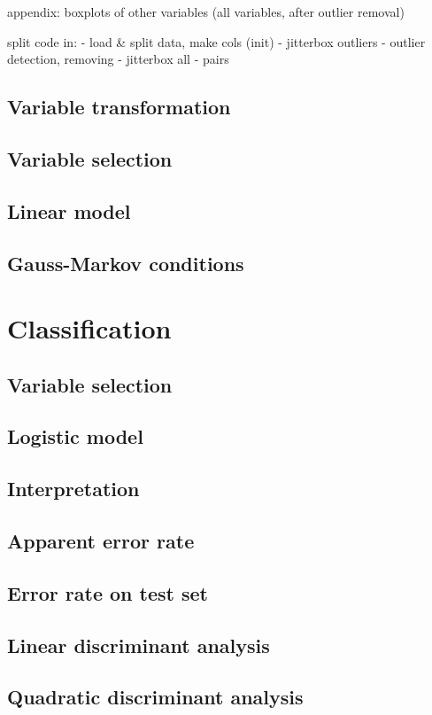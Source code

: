 \documentclass[a4paper, 12pt]{article}
\begin{document}
appendix: boxplots of other variables (all variables, after outlier removal)



split code in:
- load \& split data, make cols (init)
- jitterbox outliers
- outlier detection, removing
- jitterbox all
- pairs


\subsection*{Variable transformation}
\subsection*{Variable selection}
\subsection*{Linear model}
\subsection*{Gauss-Markov conditions}

\section{Classification}
\subsection*{Variable selection}
\subsection*{Logistic model}
\subsection*{Interpretation}
\subsection*{Apparent error rate}
\subsection*{Error rate on test set}
\subsection*{Linear discriminant analysis}
\subsection*{Quadratic discriminant analysis}
\end{document}
